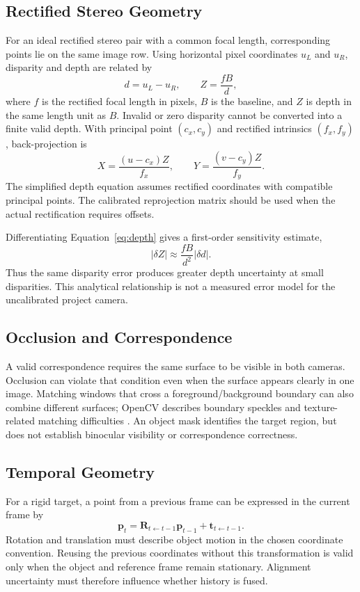 \subsection{Rectified Stereo Geometry}
For an ideal rectified stereo pair with a common focal length, corresponding points lie on the same image row. Using horizontal pixel coordinates $u_L$ and $u_R$, disparity and depth are related by \cite{opencv}
\begin{equation}
d=u_L-u_R,\qquad Z=\frac{fB}{d},
\label{eq:depth}
\end{equation}
where $f$ is the rectified focal length in pixels, $B$ is the baseline, and $Z$ is depth in the same length unit as $B$. Invalid or zero disparity cannot be converted into a finite valid depth. With principal point $(c_x,c_y)$ and rectified intrinsics $(f_x,f_y)$, back-projection is
\begin{equation}
X=\frac{(u-c_x)Z}{f_x},\qquad Y=\frac{(v-c_y)Z}{f_y}.
\end{equation}
The simplified depth equation assumes rectified coordinates with compatible principal points. The calibrated reprojection matrix should be used when the actual rectification requires offsets.

Differentiating Equation~\ref{eq:depth} gives a first-order sensitivity estimate,
\begin{equation}
|\delta Z|\approx\frac{fB}{d^2}|\delta d|.
\end{equation}
Thus the same disparity error produces greater depth uncertainty at small disparities. This analytical relationship is not a measured error model for the uncalibrated project camera.

\subsection{Occlusion and Correspondence}
A valid correspondence requires the same surface to be visible in both cameras. Occlusion can violate that condition even when the surface appears clearly in one image. Matching windows that cross a foreground/background boundary can also combine different surfaces; OpenCV describes boundary speckles and texture-related matching difficulties \cite{opencv}. An object mask identifies the target region, but does not establish binocular visibility or correspondence correctness.

\subsection{Temporal Geometry}
For a rigid target, a point from a previous frame can be expressed in the current frame by
\begin{equation}
\mathbf p_t=\mathbf R_{t\leftarrow t-1}\mathbf p_{t-1}+\mathbf t_{t\leftarrow t-1}.
\end{equation}
Rotation and translation must describe object motion in the chosen coordinate convention. Reusing the previous coordinates without this transformation is valid only when the object and reference frame remain stationary. Alignment uncertainty must therefore influence whether history is fused.

